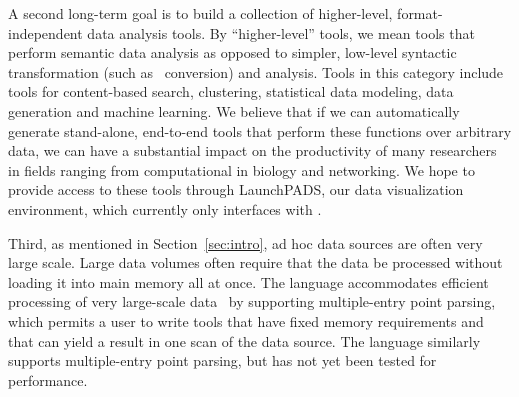 A second long-term goal is to build a collection of higher-level,
format-independent data analysis tools.  By ``higher-level'' tools, we
mean tools that perform semantic data analysis as opposed to simpler,
low-level syntactic transformation (such as \xml\ conversion) and
analysis.  Tools in this category include tools for content-based
search, clustering, statistical data modeling, data generation and
machine learning.  We believe that if we can automatically generate
stand-alone, end-to-end tools that perform these functions over
arbitrary data, we can have a substantial impact on the productivity
of many researchers in fields ranging from computational in biology
and networking.  We hope to provide access to these tools through
LaunchPADS, our data visualization environment, which currently only
interfaces with \padsc{}.

Third, as mentioned in Section~\ref{sec:intro}, ad hoc data sources are often
very large scale.  Large data volumes often require that the data be
processed without loading it into main memory all at once.  The
\padsc{} language accommodates efficient processing of very
large-scale data~\cite{fisher+:pads} by supporting multiple-entry
point parsing, which permits a user to write tools that have fixed
memory requirements and that can yield a result in one scan of the
data source. The \padsml{} language similarly supports multiple-entry
point parsing, but has not yet been tested for performance.


